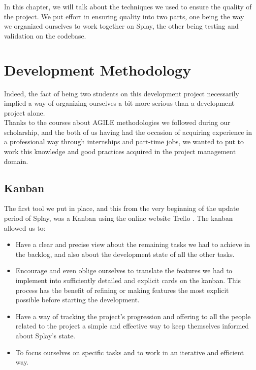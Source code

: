 \documentclass{eplmastersthesis}
\begin{document}
    In this chapter, we will talk about the techniques we used to ensure the
    quality of the project. We put effort in ensuring quality into two
    parts, one being the way we organized ourselves to work together on Splay,
    the other being testing and validation on the codebase.

    \section{Development Methodology}

      Indeed, the fact of being two students on this development project necessarily
      implied a way of organizing ourselves a bit more serious than a
      development project alone.\\

      Thanks to the courses about AGILE methodologies we followed during our
      scholarship, and the both of us having had the occasion of acquiring
      experience in a professional way through internships and part-time jobs,
      we wanted to put to work this knowledge and good practices acquired in
      the project management domain.

        \subsection{Kanban}

          The first tool we put in place, and this from the very beginning of
          the update period of Splay, was a Kanban using the online website
          Trello \cite{trello}. The kanban allowed us to: \\

          \begin{itemize}
            \item Have a clear and precise view about the remaining tasks we had
            to achieve in the backlog, and also about the development state of
            all the other tasks.
            \item Encourage and even oblige ourselves to translate the features
            we had to implement into sufficiently detailed and explicit cards on
            the kanban. This process has the benefit of refining or making
            features the most explicit possible before starting the development.
            \item Have a way of tracking the project's progression and offering
            to all the people related to the project a simple and effective way
            to keep themselves informed about Splay's state.
            \item To focus ourselves on specific tasks and to work in an
            iterative and efficient way.
          \end{itemize}
\end{document}
